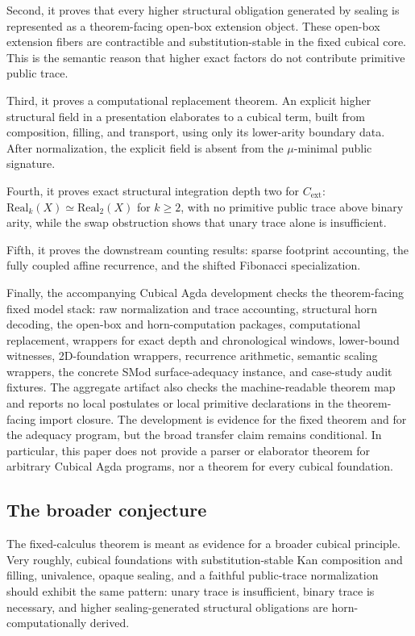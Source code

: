 \documentclass{lmcs}
\begin{document}
Second, it proves that every higher structural obligation generated by sealing is
represented as a theorem-facing open-box extension object.  These open-box
extension fibers are contractible and substitution-stable in the fixed cubical
core.  This is the semantic reason that higher exact factors do not contribute
primitive public trace.

Third, it proves a computational replacement theorem.  An explicit higher
structural field in a presentation elaborates to a cubical term, built from
composition, filling, and transport, using only its lower-arity boundary data.
After normalization, the explicit field is absent from the \(\mu\)-minimal public
signature.

Fourth, it proves exact structural integration depth two for \(C_{\mathrm{ext}}\):
\(\mathrm{Real}_k(X) \simeq \mathrm{Real}_2(X)\) for \(k\geq 2\), with no
primitive public trace above binary arity, while the swap obstruction shows that
unary trace alone is insufficient.

Fifth, it proves the downstream counting results: sparse footprint accounting,
the fully coupled affine recurrence, and the shifted Fibonacci specialization.

Finally, the accompanying Cubical Agda development checks the theorem-facing
fixed model stack: raw normalization and trace accounting, structural horn
decoding, the open-box and horn-computation packages, computational replacement,
wrappers for exact depth and chronological windows, lower-bound witnesses,
2D-foundation wrappers, recurrence arithmetic, semantic scaling
wrappers, the concrete SMod surface-adequacy instance, and case-study audit
fixtures.  The aggregate artifact also checks the machine-readable theorem map
and reports no local postulates or local primitive declarations in the
theorem-facing import closure.  The development is evidence for the fixed
theorem and for the adequacy program, but the broad transfer claim remains
conditional.  In particular, this paper does not provide a parser or elaborator
theorem for arbitrary Cubical Agda programs, nor a theorem for every cubical
foundation.

\subsection{The broader conjecture}

The fixed-calculus theorem is meant as evidence for a broader cubical principle.
Very roughly, cubical foundations with substitution-stable Kan composition and
filling, univalence, opaque sealing, and a faithful public-trace normalization
should exhibit the same pattern: unary trace is insufficient, binary trace is
necessary, and higher sealing-generated structural obligations are
horn-computationally derived.
\end{document}
